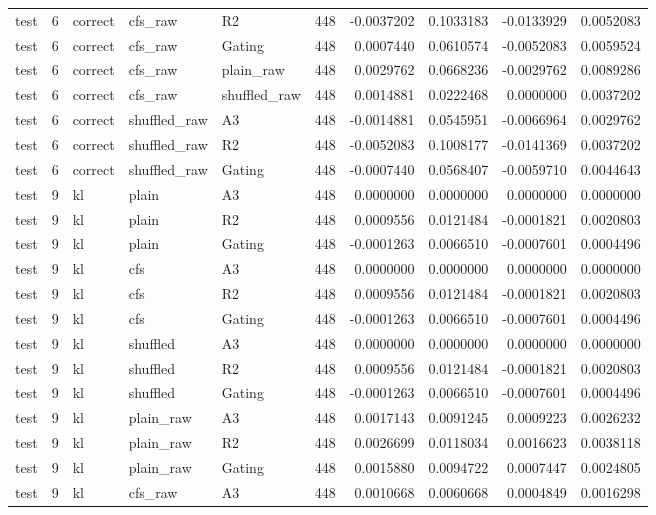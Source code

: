\begin{tabular}{lrlllrrrrr}
test & 6 & correct & cfs_raw & R2 & 448 & -0.0037202 & 0.1033183 & -0.0133929 & 0.0052083 \\
test & 6 & correct & cfs_raw & Gating & 448 & 0.0007440 & 0.0610574 & -0.0052083 & 0.0059524 \\
test & 6 & correct & cfs_raw & plain_raw & 448 & 0.0029762 & 0.0668236 & -0.0029762 & 0.0089286 \\
test & 6 & correct & cfs_raw & shuffled_raw & 448 & 0.0014881 & 0.0222468 & 0.0000000 & 0.0037202 \\
test & 6 & correct & shuffled_raw & A3 & 448 & -0.0014881 & 0.0545951 & -0.0066964 & 0.0029762 \\
test & 6 & correct & shuffled_raw & R2 & 448 & -0.0052083 & 0.1008177 & -0.0141369 & 0.0037202 \\
test & 6 & correct & shuffled_raw & Gating & 448 & -0.0007440 & 0.0568407 & -0.0059710 & 0.0044643 \\
test & 9 & kl & plain & A3 & 448 & 0.0000000 & 0.0000000 & 0.0000000 & 0.0000000 \\
test & 9 & kl & plain & R2 & 448 & 0.0009556 & 0.0121484 & -0.0001821 & 0.0020803 \\
test & 9 & kl & plain & Gating & 448 & -0.0001263 & 0.0066510 & -0.0007601 & 0.0004496 \\
test & 9 & kl & cfs & A3 & 448 & 0.0000000 & 0.0000000 & 0.0000000 & 0.0000000 \\
test & 9 & kl & cfs & R2 & 448 & 0.0009556 & 0.0121484 & -0.0001821 & 0.0020803 \\
test & 9 & kl & cfs & Gating & 448 & -0.0001263 & 0.0066510 & -0.0007601 & 0.0004496 \\
test & 9 & kl & shuffled & A3 & 448 & 0.0000000 & 0.0000000 & 0.0000000 & 0.0000000 \\
test & 9 & kl & shuffled & R2 & 448 & 0.0009556 & 0.0121484 & -0.0001821 & 0.0020803 \\
test & 9 & kl & shuffled & Gating & 448 & -0.0001263 & 0.0066510 & -0.0007601 & 0.0004496 \\
test & 9 & kl & plain_raw & A3 & 448 & 0.0017143 & 0.0091245 & 0.0009223 & 0.0026232 \\
test & 9 & kl & plain_raw & R2 & 448 & 0.0026699 & 0.0118034 & 0.0016623 & 0.0038118 \\
test & 9 & kl & plain_raw & Gating & 448 & 0.0015880 & 0.0094722 & 0.0007447 & 0.0024805 \\
test & 9 & kl & cfs_raw & A3 & 448 & 0.0010668 & 0.0060668 & 0.0004849 & 0.0016298 \\

\end{tabular}
